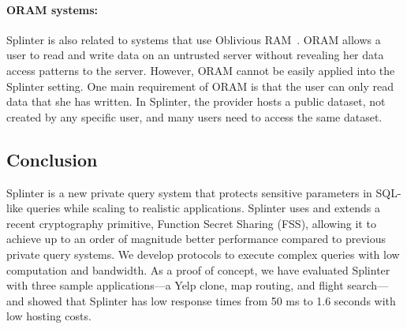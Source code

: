 \paragraph{ORAM systems:}
Splinter is also related to systems that use Oblivious RAM~\cite{stefanov:path-oram, lorch2013shroud}. 
ORAM allows a user to read and write data on an untrusted server without
revealing her data access patterns to the server. However, ORAM cannot be easily applied
into the Splinter setting. One main requirement of ORAM is that the user
can only read data that she has written. 
In Splinter, the provider hosts a public dataset, not created by any specific user, 
and many users need to access the same dataset.

\subsection{Conclusion}
\label{spl-sec:conclusion}
Splinter is a new private query system that protects sensitive parameters
in SQL-like queries while scaling to realistic applications. Splinter uses and extends a recent
cryptography primitive, Function Secret Sharing (FSS),
allowing it to achieve up to an order of magnitude better
performance compared to previous private query systems. We develop
protocols to execute complex queries
with low computation and bandwidth. As a proof of concept,
we have evaluated Splinter with three sample applications---a Yelp clone,
map routing, and flight search---and showed
that Splinter has low response times from 50 ms to 1.6 seconds with low
hosting costs.
